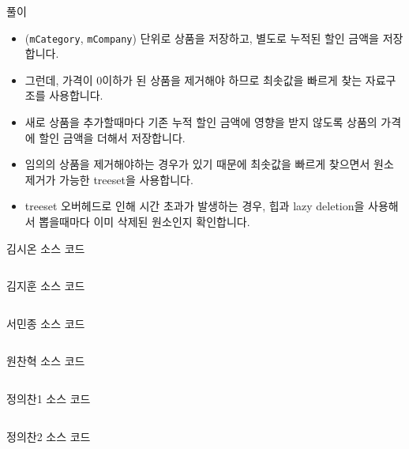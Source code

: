\documentclass{beamer}
\begin{document}
\begin{frame}{풀이}
\begin{itemize}
    \item (\texttt{mCategory}, \texttt{mCompany}) 단위로 상품을 저장하고, 별도로 누적된 할인 금액을 저장합니다.
    \item 그런데, 가격이 0이하가 된 상품을 제거해야 하므로 최솟값을 빠르게 찾는 자료구조를 사용합니다.
    \item 새로 상품을 추가할때마다 기존 누적 할인 금액에 영향을 받지 않도록 상품의 가격에 할인 금액을 더해서 저장합니다.
    \item 임의의 상품을 제거해야하는 경우가 있기 때문에 최솟값을 빠르게 찾으면서 원소 제거가 가능한 treeset을 사용합니다.
    \item treeset 오버헤드로 인해 시간 초과가 발생하는 경우, 힙과 lazy deletion을 사용해서 뽑을때마다 이미 삭제된 원소인지 확인합니다.
\end{itemize}
\end{frame}

\begin{frame}{김시온 소스 코드}
\inputminted{cpp}{../src/온라인마트/김시온/solution.cpp}
\end{frame}

\begin{frame}{김지훈 소스 코드}
\inputminted{java}{../src/온라인마트/김지훈/UserSolution.java}
\end{frame}

\begin{frame}{서민종 소스 코드}
\inputminted{java}{../src/온라인마트/서민종/UserSolution.java}
\end{frame}

\begin{frame}{원찬혁 소스 코드}
\inputminted{java}{../src/온라인마트/원찬혁/UserSolution.java}
\end{frame}

\begin{frame}{정의찬1 소스 코드}
\inputminted{java}{../src/온라인마트/정의찬/온라인마트v1.java}
\end{frame}

\begin{frame}{정의찬2 소스 코드}
\inputminted{java}{../src/온라인마트/정의찬/온라인마트v2.java}
\end{frame}
\end{document}
